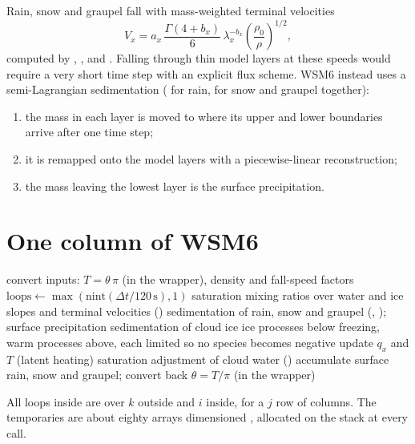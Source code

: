 Rain, snow and graupel fall with mass-weighted terminal velocities
\begin{equation}
  V_x = a_x\,\frac{\Gamma(4 + b_x)}{6}\,\lambda_x^{-b_x}\left(\frac{\rho_0}{\rho}\right)^{1/2},
\end{equation}
computed by , ,  and . Falling through thin model
layers at these speeds would require a very short time step with an explicit flux scheme. WSM6 instead uses a
semi-Lagrangian sedimentation ( for rain,  for snow and graupel
together):
\begin{enumerate}
  \item the mass in each layer is moved to where its upper and lower boundaries arrive after one time step;
  \item it is remapped onto the model layers with a piecewise-linear reconstruction;
  \item the mass leaving the lowest layer is the surface precipitation.
\end{enumerate}

\section{One column of WSM6}

\begin{algorithm}[ht]
\caption{One call of  for one column (simplified).}
\label{alg:wsm6}
\begin{algorithmic}[1]
\State convert inputs: $T = \theta\,\pi$ (in the wrapper), density and fall-speed factors
\State $\mathrm{loops} \gets \max(\mathrm{nint}(\Delta t/120\,\mathrm{s}), 1)$ 
  \State saturation mixing ratios over water and ice
  \State slopes and terminal velocities ()
  \State sedimentation of rain, snow and graupel (, ); surface precipitation
  \State sedimentation of cloud ice
  \State ice processes below freezing, warm processes above, each limited so no species becomes negative
  \State update $q_x$ and $T$ (latent heating)
  \State saturation adjustment of cloud water ()
\EndFor
\State accumulate surface rain, snow and graupel; convert back $\theta = T/\pi$ (in the wrapper)
\end{algorithmic}
\end{algorithm}

All loops inside  are over $k$ outside and $i$ inside, for a $j$ row of columns. The temporaries are
about eighty arrays dimensioned , allocated on the stack at every call.

